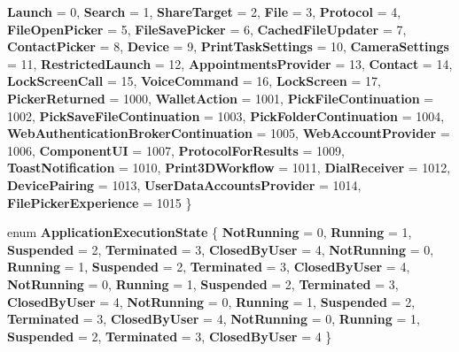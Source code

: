 \begin{DoxyCompactItemize}
\newline
{\bfseries Launch} = 0, 
{\bfseries Search} = 1, 
{\bfseries Share\+Target} = 2, 
{\bfseries File} = 3, 
\newline
{\bfseries Protocol} = 4, 
{\bfseries File\+Open\+Picker} = 5, 
{\bfseries File\+Save\+Picker} = 6, 
{\bfseries Cached\+File\+Updater} = 7, 
\newline
{\bfseries Contact\+Picker} = 8, 
{\bfseries Device} = 9, 
{\bfseries Print\+Task\+Settings} = 10, 
{\bfseries Camera\+Settings} = 11, 
\newline
{\bfseries Restricted\+Launch} = 12, 
{\bfseries Appointments\+Provider} = 13, 
{\bfseries Contact} = 14, 
{\bfseries Lock\+Screen\+Call} = 15, 
\newline
{\bfseries Voice\+Command} = 16, 
{\bfseries Lock\+Screen} = 17, 
{\bfseries Picker\+Returned} = 1000, 
{\bfseries Wallet\+Action} = 1001, 
\newline
{\bfseries Pick\+File\+Continuation} = 1002, 
{\bfseries Pick\+Save\+File\+Continuation} = 1003, 
{\bfseries Pick\+Folder\+Continuation} = 1004, 
{\bfseries Web\+Authentication\+Broker\+Continuation} = 1005, 
\newline
{\bfseries Web\+Account\+Provider} = 1006, 
{\bfseries Component\+UI} = 1007, 
{\bfseries Protocol\+For\+Results} = 1009, 
{\bfseries Toast\+Notification} = 1010, 
\newline
{\bfseries Print3\+D\+Workflow} = 1011, 
{\bfseries Dial\+Receiver} = 1012, 
{\bfseries Device\+Pairing} = 1013, 
{\bfseries User\+Data\+Accounts\+Provider} = 1014, 
\newline
{\bfseries File\+Picker\+Experience} = 1015
 \}
\item 
\mbox{\label{namespace_windows_1_1_application_model_1_1_activation_a03c52b98bf1430c4332252ef7e86b265}} 
enum {\bfseries Application\+Execution\+State} \{ \newline
{\bfseries Not\+Running} = 0, 
{\bfseries Running} = 1, 
{\bfseries Suspended} = 2, 
{\bfseries Terminated} = 3, 
\newline
{\bfseries Closed\+By\+User} = 4, 
{\bfseries Not\+Running} = 0, 
{\bfseries Running} = 1, 
{\bfseries Suspended} = 2, 
\newline
{\bfseries Terminated} = 3, 
{\bfseries Closed\+By\+User} = 4, 
{\bfseries Not\+Running} = 0, 
{\bfseries Running} = 1, 
\newline
{\bfseries Suspended} = 2, 
{\bfseries Terminated} = 3, 
{\bfseries Closed\+By\+User} = 4, 
{\bfseries Not\+Running} = 0, 
\newline
{\bfseries Running} = 1, 
{\bfseries Suspended} = 2, 
{\bfseries Terminated} = 3, 
{\bfseries Closed\+By\+User} = 4, 
\newline
{\bfseries Not\+Running} = 0, 
{\bfseries Running} = 1, 
{\bfseries Suspended} = 2, 
{\bfseries Terminated} = 3, 
\newline
{\bfseries Closed\+By\+User} = 4
 \}
\end{DoxyCompactItemize}

